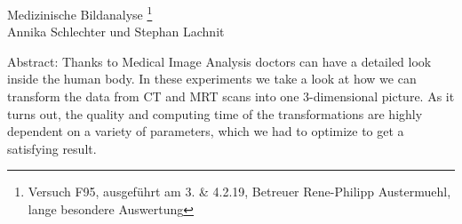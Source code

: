 \begin{titlepage}
  \begin{center}
    \vspace*{40mm}
    \Large Medizinische Bildanalyse
    \footnote{Versuch F95, ausgeführt am 3. \& 4.2.19,
      Betreuer Rene-Philipp Austermuehl,
      lange besondere Auswertung}\\
    \vspace{20mm}
    \normalsize Annika Schlechter und Stephan Lachnit\\
    \vspace{20mm}
    \parbox{0.9\textwidth}{Abstract: \small Thanks to Medical Image Analysis
      doctors can have a detailed look inside the human body. In these
      experiments we take a look at how we can transform the data from CT and
      MRT scans into one 3-dimensional picture. As it turns out, the quality
      and computing time of the transformations are highly dependent on a
      variety of parameters, which we had to optimize to get a satisfying
      result.}
  \end{center}
\end{titlepage}
